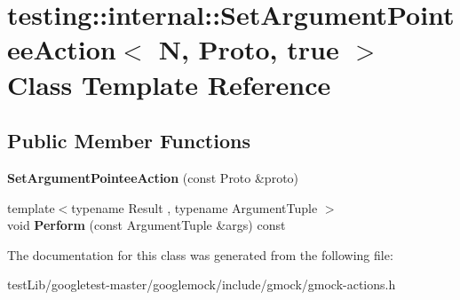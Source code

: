 \hypertarget{classtesting_1_1internal_1_1SetArgumentPointeeAction_3_01N_00_01Proto_00_01true_01_4}{}\section{testing\+:\+:internal\+:\+:Set\+Argument\+Pointee\+Action$<$ N, Proto, true $>$ Class Template Reference}
\label{classtesting_1_1internal_1_1SetArgumentPointeeAction_3_01N_00_01Proto_00_01true_01_4}
\subsection*{Public Member Functions}
\begin{DoxyCompactItemize}
\item 
\mbox{\label{classtesting_1_1internal_1_1SetArgumentPointeeAction_3_01N_00_01Proto_00_01true_01_4_af08b3a61e483f704e93872987d30ade0}} 
{\bfseries Set\+Argument\+Pointee\+Action} (const Proto \&proto)
\item 
\mbox{\label{classtesting_1_1internal_1_1SetArgumentPointeeAction_3_01N_00_01Proto_00_01true_01_4_ac89fa5dde5d2683206a77d29630917cd}} 
{\footnotesize template$<$typename Result , typename Argument\+Tuple $>$ }\\void {\bfseries Perform} (const Argument\+Tuple \&args) const
\end{DoxyCompactItemize}


The documentation for this class was generated from the following file\+:\begin{DoxyCompactItemize}
\item 
test\+Lib/googletest-\/master/googlemock/include/gmock/gmock-\/actions.\+h\end{DoxyCompactItemize}
